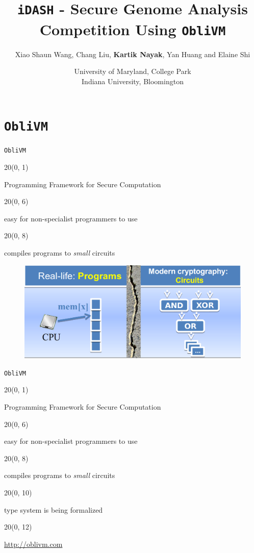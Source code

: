 \documentclass[t,ignorenonframetext]{beamer}
\title[]{{\tt iDASH} - Secure Genome Analysis Competition Using {\tt ObliVM}}
\author[]{Xiao Shaun Wang, Chang Liu, \textbf{Kartik Nayak}, Yan Huang and Elaine Shi}
\date{University of Maryland, College Park\\Indiana University, Bloomington}
\newcommand\myblock[4]{%
\begin{textblock}{#1}(#2, #3)%
  \begin{center}
    #4
  \end{center}
\end{textblock}
}
\newcommand\leftblock[4]{%
\begin{textblock}{#1}(#2, #3)%
  \vspace*{\fill}
    #4
  \vspace*{\fill}
\end{textblock}
}
\begin{document}
\frame{
\maketitle
}

\section{{\tt ObliVM}}

\begin{frame}[fragile]{{\tt ObliVM}}

\myblock{20}{0}{1}{
\LARGE{Programming Framework for Secure Computation}
}
\pause
\leftblock{20}{0}{6}{
{\color{green}{ \Large Ease-of-use:} } easy for non-specialist programmers to use
}
\pause
\leftblock{20}{0}{8}{
{\color{green}{\Large Efficiency:} } compiles programs to \emph{small} circuits
}

\end{frame}

\begin{frame}

\begin{figure}[H]
        \includegraphics[width=\textwidth]{circuit}
      \end{figure}

\end{frame}

\begin{frame}[fragile]{{\tt ObliVM}}

\myblock{20}{0}{1}{
\LARGE{Programming Framework for Secure Computation}
}

\leftblock{20}{0}{6}{
{\color{green}{ \Large Ease-of-use:} } easy for non-specialist programmers to use
}

\leftblock{20}{0}{8}{
{\color{green}{\Large Efficiency:} } compiles programs to \emph{small} circuits
}

\leftblock{20}{0}{10}{
{\color{green}{\Large Formal Security:} } type system is being formalized
}
\myblock{20}{0}{12}{
{\LARGE{\url{http://oblivm.com}}}
}

\end{frame}
\end{document}
